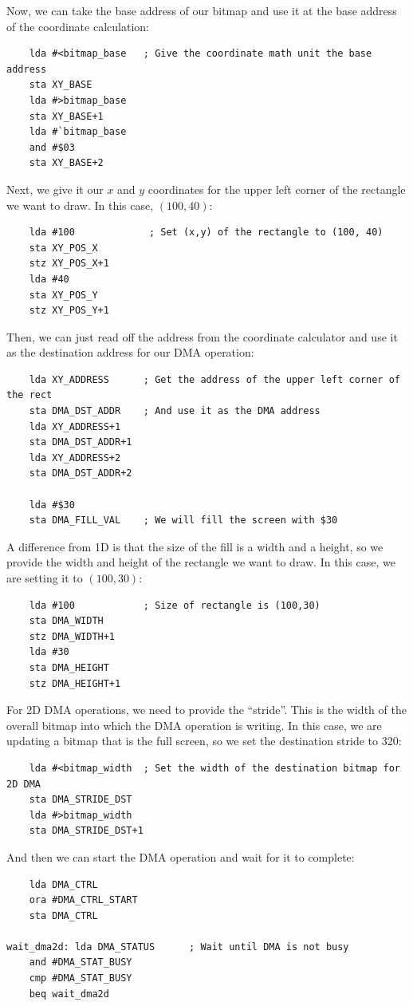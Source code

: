 Now, we can take the base address of our bitmap and use it at the base address of the coordinate calculation:

\begin{verbatim}
    lda #<bitmap_base   ; Give the coordinate math unit the base address
    sta XY_BASE
    lda #>bitmap_base
    sta XY_BASE+1
    lda #`bitmap_base
    and #$03
    sta XY_BASE+2
\end{verbatim}

Next, we give it our $x$ and $y$ coordinates for the upper left corner of the rectangle we want to draw. In this case, $(100, 40)$:

\begin{verbatim}
    lda #100             ; Set (x,y) of the rectangle to (100, 40)
    sta XY_POS_X    
    stz XY_POS_X+1
    lda #40
    sta XY_POS_Y
    stz XY_POS_Y+1
\end{verbatim}

Then, we can just read off the address from the coordinate calculator and use it as the destination address for our DMA operation:

\begin{verbatim}
    lda XY_ADDRESS      ; Get the address of the upper left corner of the rect
    sta DMA_DST_ADDR    ; And use it as the DMA address
    lda XY_ADDRESS+1
    sta DMA_DST_ADDR+1
    lda XY_ADDRESS+2
    sta DMA_DST_ADDR+2

    lda #$30
    sta DMA_FILL_VAL    ; We will fill the screen with $30     
\end{verbatim}

A difference from 1D is that the size of the fill is a width and a height, so we provide the width and height of the rectangle we want to draw. In this case, we are setting it to $(100, 30)$:

\begin{verbatim}
    lda #100            ; Size of rectangle is (100,30)
    sta DMA_WIDTH
    stz DMA_WIDTH+1
    lda #30
    sta DMA_HEIGHT
    stz DMA_HEIGHT+1
\end{verbatim}

For 2D DMA operations, we need to provide the ``stride''. This is the width of the overall bitmap into which the DMA operation is writing. In this case, we are updating a bitmap that is the full screen, so we set the destination stride to 320:

\begin{verbatim}
    lda #<bitmap_width  ; Set the width of the destination bitmap for 2D DMA
    sta DMA_STRIDE_DST
    lda #>bitmap_width
    sta DMA_STRIDE_DST+1
\end{verbatim}

And then we can start the DMA operation and wait for it to complete:

\begin{verbatim}
    lda DMA_CTRL
    ora #DMA_CTRL_START
    sta DMA_CTRL

wait_dma2d: lda DMA_STATUS      ; Wait until DMA is not busy
    and #DMA_STAT_BUSY
    cmp #DMA_STAT_BUSY
    beq wait_dma2d
\end{verbatim}